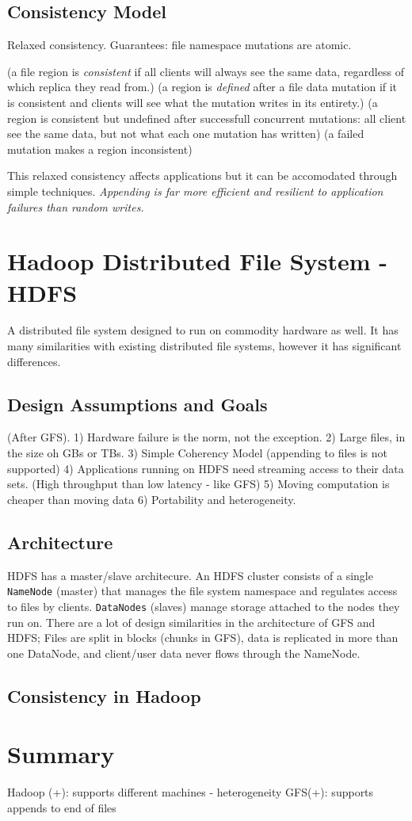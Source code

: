 \documentclass[letterpaper,twocolumn,10pt]{article}
\begin{document}
\subsection{Consistency Model}
Relaxed consistency. Guarantees: 
	file namespace mutations are atomic.

(a file region is \textit{consistent} if all clients will always see the same data, regardless of which replica they read from.)
(a region is \textit{defined} after a file data mutation if it is consistent and clients will see what the mutation writes in its entirety.)
(a region is consistent but undefined after successfull concurrent mutations: all client see the same data, but not what each one mutation has written)
(a failed mutation makes a region inconsistent)

This relaxed consistency affects applications but it can be accomodated through simple techniques. \textit{Appending is far more efficient and resilient to application failures than random writes.}


\section{Hadoop Distributed File System - HDFS}
A distributed file system designed to run on commodity hardware as well. It has many similarities with existing distributed file systems, however it has significant differences.
\subsection{Design Assumptions and Goals} 
(After GFS).
1) Hardware failure is the norm, not the exception.
2) Large files, in the size oh GBs or TBs.
3) Simple Coherency Model (appending to files is not supported)
4) Applications running on HDFS need streaming access to their data sets. (High throughput than low latency - like GFS)
5) Moving computation is cheaper than moving data
6) Portability and heterogeneity.
\subsection{Architecture}
HDFS has a master/slave architecure. An HDFS cluster consists of a single {\tt NameNode} (master) that manages the file system namespace and regulates access to files by clients. {\tt DataNodes} (slaves) manage storage attached to the nodes they run on. There are a lot of design similarities in the architecture of GFS and HDFS; Files are split in blocks (chunks in GFS), data is replicated in more than one DataNode, and client/user data never flows through the NameNode.

\subsection {Consistency in Hadoop}


\section {Summary}
Hadoop (+): supports different machines - heterogeneity
GFS(+): supports appends to end of files


{\footnotesize 
}


\theendnotes
\end{document}
